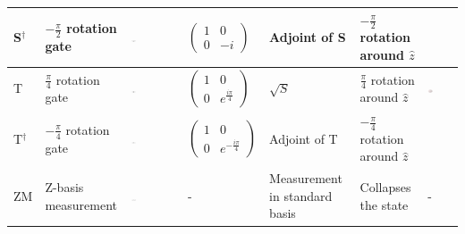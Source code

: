 \begin{table}[H]
\begin{tabular}{ C{0.3cm}  C{2cm}  C{1.5cm}  C{1.5cm} C{2.5cm} C{2cm} C{3.5cm}}
S$^\dagger$ & $-\frac{\pi}{2}$ rotation gate & \includegraphics[width=0.1\textwidth]{img/sdcircuit.png} &  $\begin{pmatrix}
 1 & 0 \\ 
 0 & -i
 \end{pmatrix}$ & Adjoint of S & $-\frac{\pi}{2}$ rotation around $\hat{z}$ & \\\midrule
T & $\frac{\pi}{4}$ rotation gate & \includegraphics[width=0.1\textwidth]{img/tcircuit.png} & $\begin{pmatrix}
 1 & 0 \\ 
 0 & e^{\frac{i\pi}{4}}
 \end{pmatrix}$ & $\sqrt{S}$ & $\frac{\pi}{4}$ rotation around $\hat{z}$ & \includegraphics[width=0.2\textwidth]{img/blochtgate.png}\\\midrule
T$^\dagger$ & $-\frac{\pi}{4}$ rotation gate & \includegraphics[width=0.1\textwidth]{img/tdcircuit.png} & $\begin{pmatrix}
 1 & 0 \\ 
 0 & e^{-\frac{i\pi}{4}}
 \end{pmatrix}$ & Adjoint of T & $-\frac{\pi}{4}$ rotation around $\hat{z}$ & \\\midrule
ZM & Z-basis measurement & \includegraphics[width=0.1\textwidth]{img/measurecircuit.png} & - & Measurement in standard basis & Collapses the state & - \\
\end{tabular}
\end{table}


